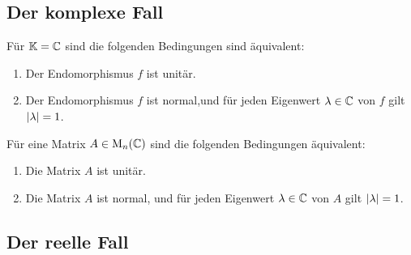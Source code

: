 \subsection{Der komplexe Fall}

\begin{theorem}
  Für $\mathbb{K} = \mathbb{C}$ sind die folgenden Bedingungen sind äquivalent:
  \begin{enumerate}
    \item
      Der Endomorphismus $f$ ist unitär.
    \item
      Der Endomorphismus $f$ ist normal,und für jeden Eigenwert $\lambda \in \mathbb{C}$ von $f$ gilt $\left| \lambda \right| = 1$.
  \end{enumerate}
\end{theorem}

\begin{corollary}
  Für eine Matrix $A \in \operatorname{M}_{n}(\mathbb{C})$ sind die folgenden Bedingungen äquivalent:
  \begin{enumerate}
    \item
      Die Matrix $A$ ist unitär.
    \item
      Die Matrix $A$ ist normal, und für jeden Eigenwert $\lambda \in \mathbb{C}$ von $A$ gilt $\left| \lambda \right| = 1$.
  \end{enumerate}
\end{corollary}



\subsection{Der reelle Fall}

